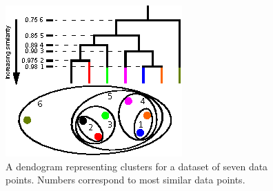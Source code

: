 \documentclass[12pt]{ucthesis}
\begin{document}
      \begin{figure}[t]
         \centering
         \includegraphics[width=0.7\columnwidth]{graphics/DendogramExample.eps}
         \caption{A dendogram representing clusters for a dataset of seven data
                  points. Numbers correspond to most similar data points.}
         \label{fig:dendogram_example}
      \end{figure}
\end{document}

